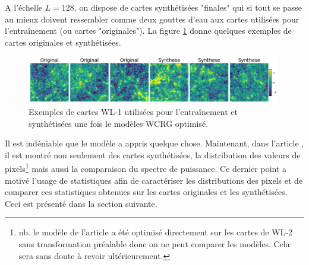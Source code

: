\documentclass[12pt,twoside]{article}
\begin{document}
A l'échelle $L=128$, on dispose de cartes synthétisées "finales" qui si tout se passe au mieux doivent ressembler comme deux gouttes d'eau aux cartes utilisées pour l'entraînement (ou cartes "originales"). La figure \ref{fig-WL1-synt-exemples} donne quelques exemples de cartes originales et synthétisées.
%
\begin{figure}
\centering
\includegraphics[width=0.99\textwidth]{fig-WL1-synt-exemples.png}
\caption{Exemples de cartes WL-1 utilisées pour l'entraînement et synthétisées une fois le modèles WCRG optimisé.}
\label{fig-WL1-synt-exemples}
\end{figure}
% 
Il est indéniable que le modèle a appris quelque chose. Maintenant, dans l'article \citep{2023arXiv230600181G}, il est montré non seulement des cartes synthétisées, la distribution des valeurs de pixels\footnote{nb. le modèle de l'article a été optimisé directement sur les cartes de WL-2 sans transformation préalable donc on ne peut comparer les modèles. Cela sera sans doute à revoir ultérieurement.} mais aussi la comparaison  du spectre de puissance. Ce dernier point a motivé l'usage de statistiques afin de caractériser les distributions des pixels et de comparer ces statistiques obtenues sur les cartes originales et les synthétisées. Ceci est présenté dans la section suivante.
%
\end{document}
